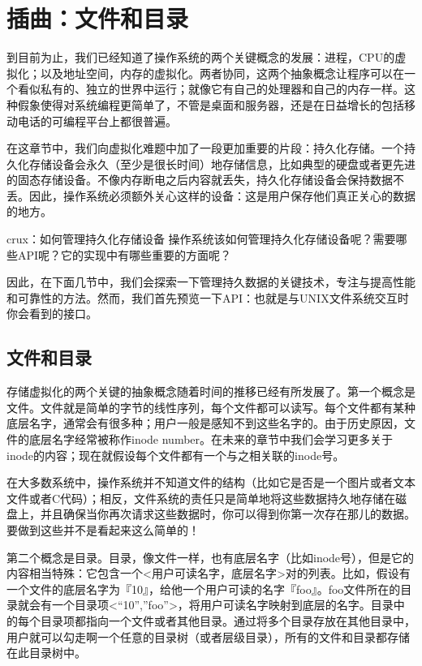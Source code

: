 \chapter{插曲：文件和目录}
\thispagestyle{empty}

到目前为止，我们已经知道了操作系统的两个关键概念的发展：进程，CPU的虚拟化；以及地址空间，内存的虚拟化。两者协同，这两个抽象概念让程序可以在一个看似私有的、独立的世界中运行；就像它有自己的处理器和自己的内存一样。这种假象使得对系统编程更简单了，不管是桌面和服务器，还是在日益增长的包括移动电话的可编程平台上都很普遍。

在这章节中，我们向虚拟化难题中加了一段更加重要的片段：持久化存储。一个持久化存储设备会永久（至少是很长时间）地存储信息，比如典型的硬盘或者更先进的固态存储设备。不像内存断电之后内容就丢失，持久化存储设备会保持数据不丢。因此，操作系统必须额外关心这样的设备：这是用户保存他们真正关心的数据的地方。

crux：如何管理持久化存储设备
操作系统该如何管理持久化存储设备呢？需要哪些API呢？它的实现中有哪些重要的方面呢？

因此，在下面几节中，我们会探索一下管理持久数据的关键技术，专注与提高性能和可靠性的方法。然而，我们首先预览一下API：也就是与UNIX文件系统交互时你会看到的接口。

\section{文件和目录}

存储虚拟化的两个关键的抽象概念随着时间的推移已经有所发展了。第一个概念是文件。文件就是简单的字节的线性序列，每个文件都可以读写。每个文件都有某种底层名字，通常会有很多种；用户一般是感知不到这些名字的。由于历史原因，文件的底层名字经常被称作inode number。在未来的章节中我们会学习更多关于inode的内容；现在就假设每个文件都有一个与之相关联的inode号。

在大多数系统中，操作系统并不知道文件的结构（比如它是否是一个图片或者文本文件或者C代码）；相反，文件系统的责任只是简单地将这些数据持久地存储在磁盘上，并且确保当你再次请求这些数据时，你可以得到你第一次存在那儿的数据。要做到这些并不是看起来这么简单的！

第二个概念是目录。目录，像文件一样，也有底层名字（比如inode号），但是它的内容相当特殊：它包含一个<用户可读名字，底层名字>对的列表。比如，假设有一个文件的底层名字为『10』，给他一个用户可读的名字『foo』。foo文件所在的目录就会有一个目录项<“10”,”foo”>，将用户可读名字映射到底层的名字。目录中的每个目录项都指向一个文件或者其他目录。通过将多个目录存放在其他目录中，用户就可以勾走啊一个任意的目录树（或者层级目录），所有的文件和目录都存储在此目录树中。

